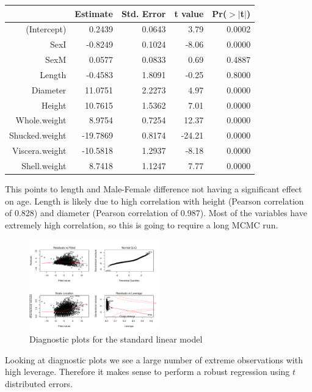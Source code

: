 \documentclass[10pt]{extarticle}
\begin{document}
\begin{table}[ht]
	\centering
	\begin{tabular}{rrrrr}
		\hline
		& Estimate & Std. Error & t value & Pr($>$$|$t$|$) \\ 
		\hline
		(Intercept) & 0.2439 & 0.0643 & 3.79 & 0.0002 \\ 
		SexI & -0.8249 & 0.1024 & -8.06 & 0.0000 \\ 
		SexM & 0.0577 & 0.0833 & 0.69 & 0.4887 \\ 
		Length & -0.4583 & 1.8091 & -0.25 & 0.8000 \\ 
		Diameter & 11.0751 & 2.2273 & 4.97 & 0.0000 \\ 
		Height & 10.7615 & 1.5362 & 7.01 & 0.0000 \\ 
		Whole.weight & 8.9754 & 0.7254 & 12.37 & 0.0000 \\ 
		Shucked.weight & -19.7869 & 0.8174 & -24.21 & 0.0000 \\ 
		Viscera.weight & -10.5818 & 1.2937 & -8.18 & 0.0000 \\ 
		Shell.weight & 8.7418 & 1.1247 & 7.77 & 0.0000 \\ 
		\hline
	\end{tabular}
\end{table}

This points to length and Male-Female difference not having a significant effect on age. Length is likely due to high correlation with height (Pearson correlation of 0.828) and diameter (Pearson correlation of 0.987). Most of the variables have extremely high correlation, so this is going to require a long MCMC run.

\begin{figure}[H]
	\centering
	\includegraphics[width = 0.5\textwidth]{../flmdiag}
	\caption{Diagnostic plots for the standard linear model}
	\label{fig:lmplots}
\end{figure}

Looking at diagnostic plots we see a large number of extreme observations with high leverage. Therefore it makes sense to perform a robust regression using $t$ distributed errors.  
\end{document}

